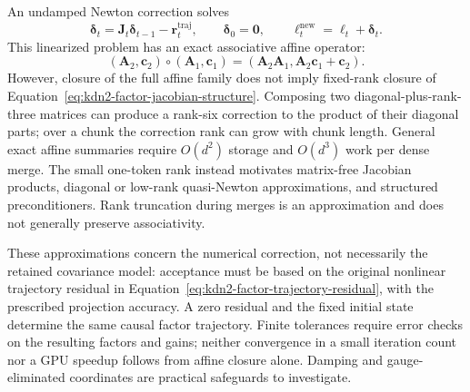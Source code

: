 \documentclass[11pt]{article}
\newcommand{\ve}[1]{\boldsymbol{#1}}
\begin{document}
An undamped Newton correction solves
\begin{equation}
  \ve{\delta}_t
  =\ve{J}_t\ve{\delta}_{t-1}-\ve{r}^{\mathrm{traj}}_t,
  \qquad \ve{\delta}_0=\ve{0},
  \qquad \ve{\ell}^{\mathrm{new}}_t=\ve{\ell}_t+\ve{\delta}_t.
  \label{eq:kdn2-factor-newton-scan}
\end{equation}
This linearized problem has an exact associative affine operator:
\begin{equation}
  (\ve{A}_2,\ve{c}_2)\circ(\ve{A}_1,\ve{c}_1)
  =(\ve{A}_2\ve{A}_1,\ve{A}_2\ve{c}_1+\ve{c}_2).
  \label{eq:kdn2-factor-affine-composition}
\end{equation}
However, closure of the full affine family does not imply fixed-rank closure of
Equation~\eqref{eq:kdn2-factor-jacobian-structure}.  Composing two diagonal-plus-rank-three
matrices can produce a rank-six correction to the product of their diagonal parts; over a
chunk the correction rank can grow with chunk length.  General exact affine summaries require
$O(d^2)$ storage and $O(d^3)$ work per dense merge.  The small one-token rank instead motivates
matrix-free Jacobian products, diagonal or low-rank quasi-Newton approximations, and structured
preconditioners.  Rank truncation during merges is an approximation and does not generally
preserve associativity.

These approximations concern the numerical correction, not necessarily the retained covariance
model: acceptance must be based on the original nonlinear trajectory residual in
Equation~\eqref{eq:kdn2-factor-trajectory-residual}, with the prescribed projection accuracy.
A zero residual and the fixed initial state determine the same causal factor trajectory.
Finite tolerances require error checks on the resulting factors and gains; neither convergence
in a small iteration count nor a GPU speedup follows from affine closure alone.  Damping and
gauge-eliminated coordinates are practical safeguards to investigate.
\end{document}

